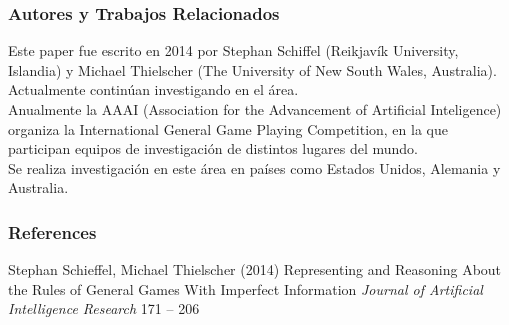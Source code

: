 \documentclass{beamer}
\begin{document}
\begin{frame}
\frametitle{Autores y Trabajos Relacionados}

Este paper fue escrito en 2014 por Stephan Schiffel (Reikjavík University, Islandia) y Michael Thielscher (The University of New South Wales, Australia).\\
Actualmente continúan investigando en el área.\\
\vspace{10pt}
Anualmente la AAAI (Association for the Advancement of Artificial Inteligence) organiza la International General Game Playing Competition, en la que participan equipos de investigación de distintos lugares del mundo.\\
\vspace{10pt}
Se realiza investigación en este área en países como Estados Unidos, Alemania y Australia.
 

\end{frame}


\begin{frame}
\frametitle{References}
\footnotesize{
\begin{thebibliography}{99} %
 Stephan Schieffel, Michael Thielscher (2014)
\newblock Representing and Reasoning About the Rules of General Games With Imperfect Information
\newblock \emph{Journal of Artificial Intelligence Research} 171 -- 206
\end{thebibliography}
}
\end{frame}
\end{document}
